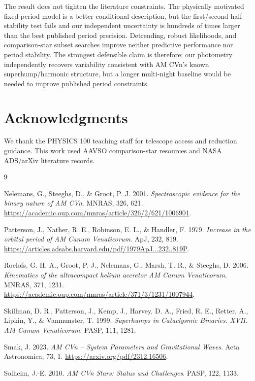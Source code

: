 \documentclass[11pt]{article}
\begin{document}
The result does not tighten the literature constraints.  The physically
motivated fixed-period model is a better conditional description, but the
first/second-half stability test fails and our independent uncertainty is
hundreds of times larger than the best published period precision.  Detrending,
robust likelihoods, and comparison-star subset searches improve neither
predictive performance nor period stability.  The strongest defensible claim is
therefore: our photometry independently recovers variability consistent with AM
CVn's known superhump/harmonic structure, but a longer multi-night baseline
would be needed to improve published period constraints.

\section*{Acknowledgments}

We thank the PHYSICS 100 teaching staff for telescope access and reduction
guidance.  This work used AAVSO comparison-star resources and NASA ADS/arXiv
literature records.

\begin{thebibliography}{9}

Nelemans, G., Steeghs, D., \& Groot, P. J. 2001.
\textit{Spectroscopic evidence for the binary nature of AM CVn}.
MNRAS, 326, 621.
\url{https://academic.oup.com/mnras/article/326/2/621/1006901}.

Patterson, J., Nather, R. E., Robinson, E. L., \& Handler, F. 1979.
\textit{Increase in the orbital period of AM Canum Venaticorum}.
ApJ, 232, 819.
\url{https://articles.adsabs.harvard.edu/pdf/1979ApJ...232..819P}.

Roelofs, G. H. A., Groot, P. J., Nelemans, G., Marsh, T. R., \& Steeghs, D. 2006.
\textit{Kinematics of the ultracompact helium accretor AM Canum Venaticorum}.
MNRAS, 371, 1231.
\url{https://academic.oup.com/mnras/article/371/3/1231/1007944}.

Skillman, D. R., Patterson, J., Kemp, J., Harvey, D. A., Fried, R. E.,
Retter, A., Lipkin, Y., \& Vanmunster, T. 1999.
\textit{Superhumps in Cataclysmic Binaries. XVII. AM Canum Venaticorum}.
PASP, 111, 1281.

Smak, J. 2023.
\textit{AM CVn -- System Parameters and Gravitational Waves}.
Acta Astronomica, 73, 1.
\url{https://arxiv.org/pdf/2312.16506}.

Solheim, J.-E. 2010.
\textit{AM CVn Stars: Status and Challenges}.
PASP, 122, 1133.

\end{thebibliography}
\end{document}
